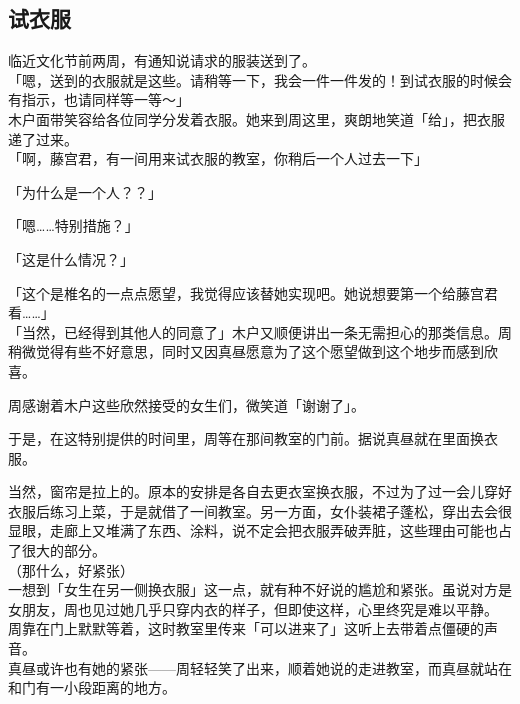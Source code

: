 \subsection{试衣服}

临近文化节前两周，有通知说请求的服装送到了。\\

「嗯，送到的衣服就是这些。请稍等一下，我会一件一件发的！到试衣服的时候会有指示，也请同样等一等～」\\

木户面带笑容给各位同学分发着衣服。她来到周这里，爽朗地笑道「给」，把衣服递了过来。\\

「啊，藤宫君，有一间用来试衣服的教室，你稍后一个人过去一下」

「为什么是一个人？？」

「嗯……特别措施？」

「这是什么情况？」

「这个是椎名的一点点愿望，我觉得应该替她实现吧。她说想要第一个给藤宫君看……」\\

「当然，已经得到其他人的同意了」木户又顺便讲出一条无需担心的那类信息。周稍微觉得有些不好意思，同时又因真昼愿意为了这个愿望做到这个地步而感到欣喜。

周感谢着木户这些欣然接受的女生们，微笑道「谢谢了」。\\

\vspace{2\baselineskip}

于是，在这特别提供的时间里，周等在那间教室的门前。据说真昼就在里面换衣服。

当然，窗帘是拉上的。原本的安排是各自去更衣室换衣服，不过为了过一会儿穿好衣服后练习上菜，于是就借了一间教室。另一方面，女仆装裙子蓬松，穿出去会很显眼，走廊上又堆满了东西、涂料，说不定会把衣服弄破弄脏，这些理由可能也占了很大的部分。\\

（那什么，好紧张）\\

一想到「女生在另一侧换衣服」这一点，就有种不好说的尴尬和紧张。虽说对方是女朋友，周也见过她几乎只穿内衣的样子，但即使这样，心里终究是难以平静。\\

周靠在门上默默等着，这时教室里传来「可以进来了」这听上去带着点僵硬的声音。\\

真昼或许也有她的紧张——周轻轻笑了出来，顺着她说的走进教室，而真昼就站在和门有一小段距离的地方。\\

